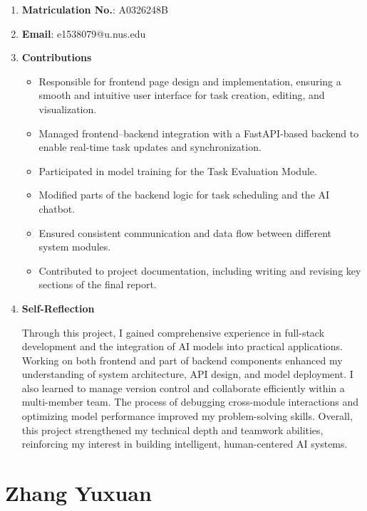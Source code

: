 \documentclass[12pt, a4paper]{article}
\begin{document}
    \begin{enumerate}
        \item \textbf{Matriculation No.}: A0326248B
        \item \textbf{Email}: e1538079@u.nus.edu
        \item \textbf{Contributions}

            \begin{itemize}
                \item Responsible for frontend page design and implementation, ensuring a smooth and intuitive user interface for task creation, editing, and visualization.
                \item Managed frontend–backend integration with a FastAPI-based backend to enable real-time task updates and synchronization.
                \item Participated in model training for the Task Evaluation Module.
                \item Modified parts of the backend logic for task scheduling and the AI chatbot.
                \item Ensured consistent communication and data flow between different system modules.
                \item Contributed to project documentation, including writing and revising key sections of the final report.
            \end{itemize}
        
        \item \textbf{Self-Reflection}
        
            Through this project, I gained comprehensive experience in full-stack development and the integration of AI models into practical applications. Working on both frontend and part of backend components enhanced my understanding of system architecture, API design, and model deployment. I also learned to manage version control and collaborate efficiently within a multi-member team. The process of debugging cross-module interactions and optimizing model performance improved my problem-solving skills. Overall, this project strengthened my technical depth and teamwork abilities, reinforcing my interest in building intelligent, human-centered AI systems.
    \end{enumerate}

    

\section{Zhang Yuxuan} 
\end{document}
